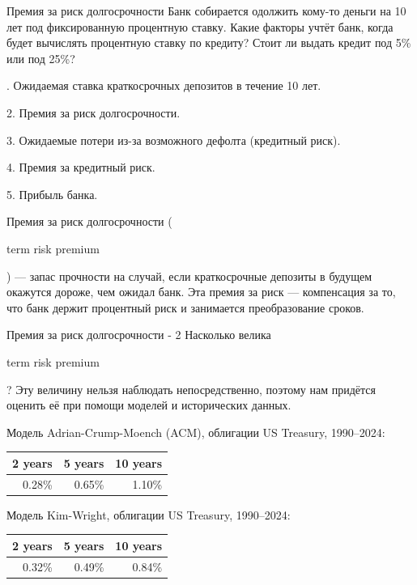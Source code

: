 \documentclass{beamer}
\newcommand{\en}[1]{\begin{otherlanguage}{english}#1\end{otherlanguage}}
\begin{document}
\begin{frame}{Премия за риск долгосрочности}
\justify
Банк собирается одолжить кому-то деньги на 10 лет под фиксированную процентную ставку. Какие факторы учтёт банк, когда будет вычислять процентную ставку по кредиту? Стоит ли выдать кредит под 5\% или под 25\%?

. Ожидаемая ставка краткосрочных депозитов в течение 10 лет.

2. Премия за риск долгосрочности.

3. Ожидаемые потери из-за возможного дефолта (кредитный риск).

4. Премия за кредитный риск.

5. Прибыль банка.

\justify
\alert{Премия за риск долгосрочности} (\en{term risk premium}) --- запас прочности на случай, если краткосрочные депозиты в будущем окажутся дороже, чем ожидал банк. Эта премия за риск --- компенсация за то, что банк держит процентный риск и занимается преобразование сроков.
\end{frame}



\begin{frame}{Премия за риск долгосрочности - 2}
\justify
Насколько велика \en{term risk premium}? Эту величину нельзя наблюдать непосредственно, поэтому нам придётся оценить её при помощи моделей и исторических данных.

\justify
Модель Adrian-Crump-Moench (ACM), облигации US Treasury, 1990--2024:

\begin{tabular}{r|r|r}
2 years & 5 years & 10 years \\ \hline
0.28\% & 0.65\% & 1.10\% 
\end{tabular}

\justify
Модель Kim-Wright, облигации US Treasury, 1990--2024:

\begin{tabular}{r|r|r}
2 years & 5 years & 10 years \\ \hline
0.32\% & 0.49\% & 0.84\%
\end{tabular}

\end{frame}
\end{document}
